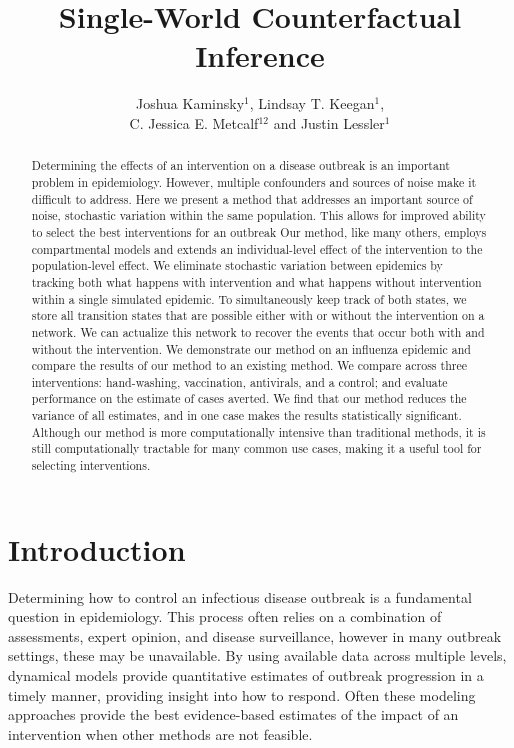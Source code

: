 \documentclass[PTRSB]{rsos}
\title{Single-World Counterfactual Inference}
\author{%
Joshua Kaminsky$^{1}$, Lindsay T. Keegan$^{1}$,\\C. Jessica E. Metcalf$^{12}$ and Justin Lessler$^{1}$}
\begin{document}
\begin{abstract} %
  Determining the effects of an intervention on a disease outbreak is an important problem in epidemiology.
  However, multiple confounders and sources of noise make it difficult to address. %
  Here we present a method that addresses an important source of noise, stochastic variation within the same population. %
  This allows for improved ability to select the best interventions for an outbreak
  Our method, like many others, employs compartmental models and extends an individual-level effect of the intervention to the population-level effect. %
  We eliminate stochastic variation between epidemics by tracking both what happens with intervention and what happens without intervention within a single simulated epidemic. %
  To simultaneously keep track of both states, we store all transition states that are possible either with or without the intervention on a network. %
  We can actualize this network to recover the events that occur both with and without the intervention. %
  We demonstrate our method on an influenza epidemic and compare the results of our method to an existing method.
  We compare across three interventions: hand-washing, vaccination, antivirals, and a control; and evaluate performance on the estimate of cases averted.
  We find that our method reduces the variance of all estimates, and in one case makes the results statistically significant. %
  Although our method is more computationally intensive than traditional methods, it is still computationally tractable for many common use cases, making it a useful tool for selecting interventions. %
\end{abstract}



\maketitle


\section{Introduction}
Determining how to control an infectious disease outbreak is a fundamental question in epidemiology.
This process often relies on a combination of assessments, expert opinion, and disease surveillance, however in many outbreak settings, these may be unavailable. %
By using available data across multiple levels, dynamical models provide quantitative estimates of outbreak progression in a timely manner, providing insight into how to respond.
Often these modeling approaches provide the best evidence-based estimates of the impact of an intervention when other methods are not feasible.
\end{document}
